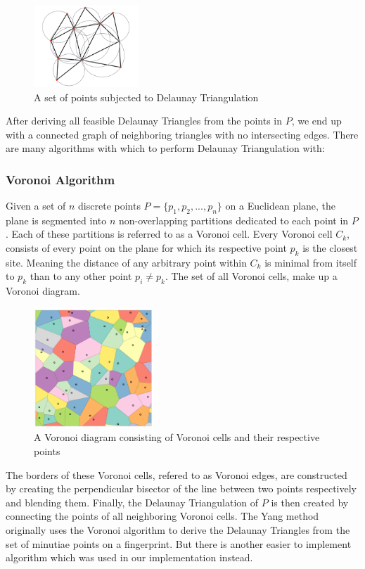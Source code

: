 \documentclass[fyp]{socreport}
\begin{document}
\begin{figure}[H]
	\centering
	\includegraphics[width=0.35\textwidth]
	{delaunay}
	\caption{A set of points subjected to Delaunay Triangulation}
\end{figure}

After deriving all feasible Delaunay Triangles from the points in $P$, we end up with a connected graph of neighboring triangles with no intersecting edges. There are many algorithms with which to perform Delaunay Triangulation with:

\subsubsection{Voronoi Algorithm}
Given a set of $n$ discrete points $P = \{p_1, p_2, ..., p_n\}$ on a Euclidean plane, the plane is segmented into $n$ non-overlapping partitions dedicated to each point in $P$. Each of these partitions is referred to as a Voronoi cell.  Every Voronoi cell $C_k$, consists of every point on the plane for which its respective point $p_k$ is the closest site. Meaning the distance of any arbitrary point within $C_k$ is minimal from itself to $p_k$ than to any other point $p_i \ne p_k$. The set of all Voronoi cells, make up a Voronoi diagram.

\begin{figure}[H]
	\centering
	\includegraphics[width=0.4\textwidth]
	{voronoi}
	\caption{A Voronoi diagram consisting of Voronoi cells and their respective points}
\end{figure}

The borders of these Voronoi cells, refered to as Voronoi edges, are constructed by creating the perpendicular bisector of the line between two points respectively and blending them. Finally, the Delaunay Triangulation of $P$ is then created by connecting the points of all neighboring Voronoi cells. The Yang method originally uses the Voronoi algorithm to derive the Delaunay Triangles from the set of minutiae points on a fingerprint. But there is another easier to implement algorithm which was used in our implementation instead.
\end{document}

